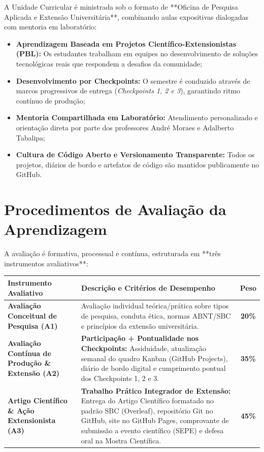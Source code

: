 \documentclass[12pt,a4paper]{article}
\begin{document}
A Unidade Curricular é ministrada sob o formato de **Oficina de Pesquisa Aplicada e Extensão Universitária**, combinando aulas expositivas dialogadas com mentoria em laboratório:

\begin{itemize}[leftmargin=*]
    \item \textbf{Aprendizagem Baseada em Projetos Científico-Extensionistas (PBL):} Os estudantes trabalham em equipes no desenvolvimento de soluções tecnológicas reais que respondem a desafios da comunidade;
    \item \textbf{Desenvolvimento por Checkpoints:} O semestre é conduzido através de marcos progressivos de entrega (\textit{Checkpoints 1, 2 e 3}), garantindo ritmo contínuo de produção;
    \item \textbf{Mentoria Compartilhada em Laboratório:} Atendimento personalizado e orientação direta por parte dos professores André Moraes e Adalberto Tabalipa;
    \item \textbf{Cultura de Código Aberto e Versionamento Transparente:} Todos os projetos, diários de bordo e artefatos de código são mantidos publicamente no GitHub.
\end{itemize}

\section{Procedimentos de Avaliação da Aprendizagem}

A avaliação é formativa, processual e contínua, estruturada em **três instrumentos avaliativos**:

\begin{table}[H]
\centering
\small
\begin{tabularx}{\textwidth}{|l|X|c|}
\hline
\rowcolor{cinzaCabecalho}
\textbf{Instrumento Avaliativo} & \textbf{Descrição e Critérios de Desempenho} & \textbf{Peso} \\ \hline
\textbf{Avaliação Conceitual de Pesquisa (A1)} & Avaliação individual teórica/prática sobre tipos de pesquisa, conduta ética, normas ABNT/SBC e princípios da extensão universitária. & \textbf{20\%} \\ \hline
\rowcolor{cinzaLinha}
\textbf{Avaliação Contínua de Produção \& Extensão (A2)} & \textbf{Participação + Pontualidade nos Checkpoints:} Assiduidade, atualização semanal do quadro Kanban (GitHub Projects), diário de bordo digital e cumprimento pontual dos Checkpoints 1, 2 e 3. & \textbf{35\%} \\ \hline
\textbf{Artigo Científico \& Ação Extensionista (A3)} & \textbf{Trabalho Prático Integrador de Extensão:} Entrega do Artigo Científico formatado no padrão SBC (Overleaf), repositório Git no GitHub, site no GitHub Pages, comprovante de submissão a evento científico (SEPE) e defesa oral na Mostra Científica. & \textbf{45\%} \\ \hline
\end{tabularx}
\end{table}
\end{document}
